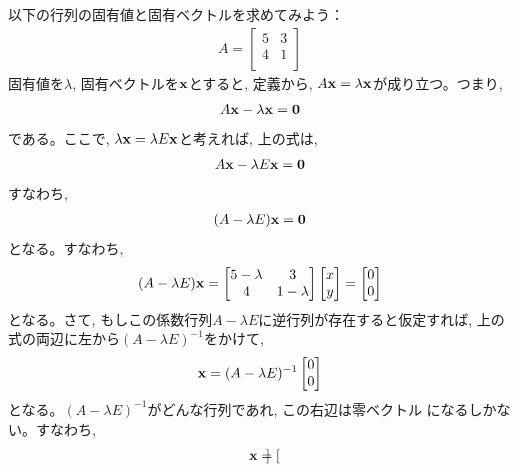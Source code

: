 \begin{exmpl}\label{ex:matrix_eigen1} 以下の行列の固有値と固有ベクトルを求めてみよう：
\begin{eqnarray}
A=\begin{bmatrix}
5 & 3 \\
4 & 1 \\
\end{bmatrix}
\end{eqnarray}
固有値を$\lambda$, 固有ベクトルを${\bf x}$とすると, 定義から, $A{\bf x}=\lambda {\bf x}$が成り立つ。つまり, 
\begin{eqnarray}
A{\bf x}-\lambda {\bf x}={\bf 0}
\end{eqnarray}
である。ここで, $\lambda {\bf x}=\lambda E {\bf x}$と考えれば, 上の式は, 
\begin{eqnarray}
A{\bf x}-\lambda E{\bf x}={\bf 0}
\end{eqnarray}
すなわち, 
\begin{eqnarray}
(A-\lambda E){\bf x}={\bf 0}\label{eq:matrix_eigen_eq0}
\end{eqnarray}
となる。すなわち, 
\begin{eqnarray}
(A-\lambda E){\bf x}=
\begin{bmatrix}
5-\lambda & 3 \\
4          & 1-\lambda \\
\end{bmatrix}
\begin{bmatrix}
x \\
y \\
\end{bmatrix}
=\begin{bmatrix}
0 \\
0 \\
\end{bmatrix}\label{eq:matrix_eigen_eq000}
\end{eqnarray}
となる。さて, もしこの係数行列$A-\lambda E$に逆行列が存在すると仮定すれば, 
上の式の両辺に左から$(A-\lambda E)^{-1}$をかけて, 
\begin{eqnarray}
{\bf x}
=(A-\lambda E)^{-1}
\begin{bmatrix}
0 \\
0 \\
\end{bmatrix}
\end{eqnarray}
となる。$(A-\lambda E)^{-1}$がどんな行列であれ, この右辺は零ベクトル
になるしかない。すなわち, 
\begin{eqnarray}
{\bf x}
=\begin{bmatrix}

\end{bmatrix}
\end{eqnarray}
\end{exmpl}
